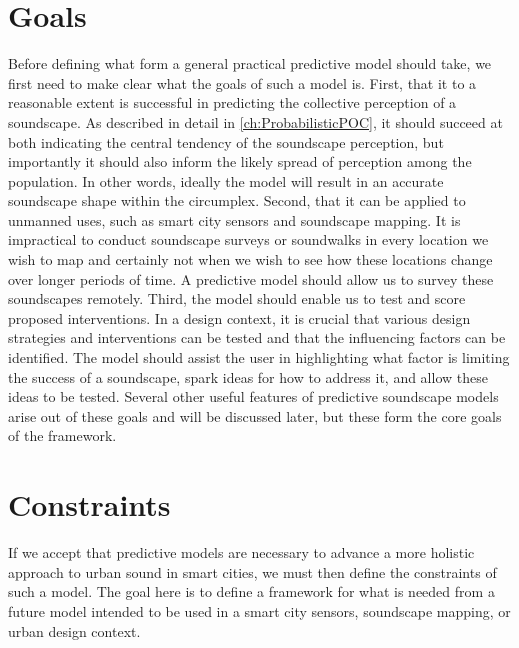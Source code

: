 \section{Goals}
Before defining what form a general practical predictive model should take, we first need to make clear what the goals of such a model is. First, that it to a reasonable extent is successful in predicting the collective perception of a soundscape. As described in detail in \cref{ch:ProbabilisticPOC}, it should succeed at both indicating the central tendency of the soundscape perception, but importantly it should also inform the likely spread of perception among the population. In other words, ideally the model will result in an accurate soundscape shape within the circumplex. Second, that it can be applied to unmanned uses, such as smart city sensors and soundscape mapping. It is impractical to conduct soundscape surveys or soundwalks in every location we wish to map and certainly not when we wish to see how these locations change over longer periods of time. A predictive model should allow us to survey these soundscapes remotely. Third, the model should enable us to test and score proposed interventions. In a design context, it is crucial that various design strategies and interventions can be tested and that the influencing factors can be identified. The model should assist the user in highlighting what factor is limiting the success of a soundscape, spark ideas for how to address it, and allow these ideas to be tested. Several other useful features of predictive soundscape models arise out of these goals and will be discussed later, but these form the core goals of the framework.

\section{Constraints}
If we accept that predictive models are necessary to advance a more holistic approach to urban sound in smart cities, we must then define the constraints of such a model. The goal here is to define a framework for what is needed from a future model intended to be used in a smart city sensors, soundscape mapping, or urban design context.

